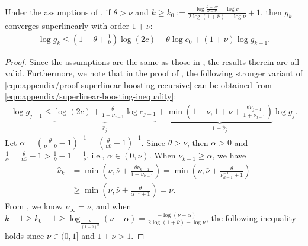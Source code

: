 \begin{corollary}
    \label{cor:appendix/quadratic-rate-boosting}
    Under the assumptions of ,
    if $\theta > \nu$ and $k \geq k_0 := 
    \frac{\log\frac{\theta-\nu\bar\nu}{\theta-\nu}-\log\nu}{2\log(1+\bar\nu)-\log\nu} + 1$, 
    then $g_k$ converges superlinearly with order $1 + \nu$:
    \begin{align}
        \log g_{k}
        \leq
        \left( 1 + \theta + \frac{1}{\bar\nu} \right)\log (2c) + \theta  \log c_0
        + (1 + \nu) \log g_{k-1}.
    \end{align}
\end{corollary}
\begin{proof}
    Since the assumptions are the same as those in , the results therein are all valid.
    Furthermore, we note that in the proof of , 
    the following stronger variant of \eqref{eqn:appendix/proof-superlinear-boosting-recursive} can be obtained from \eqref{eqn:appendix/superlinear-boosting-inequality}:
    \begin{align}
        \log g_{j+1}
        \leq 
        \underbrace{\log (2c) + \frac{\theta}{1 + \nu_{j-1}} \log c_{j-1}}_{\hat c_j}
        + 
        \underbrace{\min\left(1 + \nu,  1 + \bar\nu + \frac{\theta\nu_{j-1}}{1 + \nu_{j-1}} \right)}_{1 + \hat \nu_j} \log g_j.
        \label{eqn:appendix/proof-superlinear-boosting-recursive-strong}
    \end{align}
    Let $\alpha = \left (\frac{\theta}{\nu - \bar \nu} - 1\right )^{-1} = \left (\frac{\theta}{\nu\bar\nu} - 1\right )^{-1}$.
    Since $\theta > \nu$, 
    then $\alpha > 0$ and $\frac{1}{\alpha} = \frac{\theta}{\nu\bar\nu} - 1 > \frac{1}{\bar\nu} - 1 = \frac{1}{\nu}$, i.e., $\alpha \in (0, \nu)$.
    When $\nu_{k-1} \geq \alpha$, we have
    \begin{align*}
       \hat \nu_{k} &=
       \min\left( \nu, \bar\nu + \frac{\theta\nu_{k-1}}{1+\nu_{k-1}} \right)
        =
        \min\left( \nu, \bar\nu + \frac{\theta}{\nu_{k-1}^{-1}+1} \right) \\
        &\geq
        \min\left( \nu, \bar\nu + \frac{\theta}{\alpha^{-1}+1} \right)
        =\nu.
    \end{align*}
    From ,
    we know $\nu_\infty = \nu$, and when $k - 1 \geq k_0 - 1 \geq \log_{\frac{\nu}{(1 + \bar\nu)^2}}(\nu - \alpha) = \frac{-\log(\nu-\alpha)}{2\log(1+\bar\nu)-\log\nu}$, the following inequality holds since $\nu \in (0, 1]$ and $1 + \bar\nu > 1$.

\end{proof}
